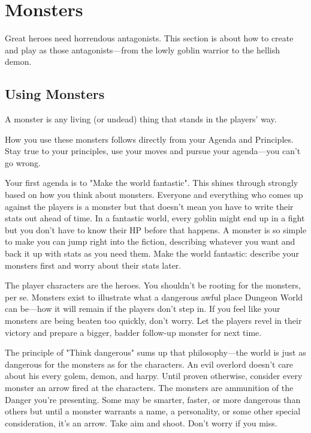 \chapter{Monsters}
  
            

Great heroes need horrendous antagonists. This section is about how to create and play as those antagonists—from the lowly goblin warrior to the hellish demon.

       
\section{Using Monsters}   
       

A monster is any living (or undead) thing that stands in the players' way.

       

How you use these monsters follows directly from your Agenda and Principles. Stay true to your principles, use your moves and pursue your agenda—you can't go wrong. 

       

Your first agenda is to "Make the world fantastic". This shines through strongly based on how you think about monsters. Everyone and everything who comes up against the players is a monster but that doesn't mean you have to write their stats out ahead of time. In a fantastic world, every goblin might end up in a fight but you don't have to know their HP before that happens. A monster is so simple to make you can jump right into the fiction, describing whatever you want and back it up with stats as you need them. Make the world fantastic: describe your monsters first and worry about their stats later.

       

The player characters are the heroes. You shouldn't be rooting for the monsters, per se. Monsters exist to illustrate what a dangerous awful place Dungeon World can be—how it will remain if the players don't step in. If you feel like your monsters are being beaten too quickly, don't worry. Let the players revel in their victory and prepare a bigger, badder follow-up monster for next time.

       

The principle of "Think dangerous" sums up that philosophy—the world is just as dangerous for the monsters as for the characters. An evil overlord doesn't care about his every golem, demon, and harpy. Until proven otherwise, consider every monster an arrow fired at the characters. The monsters are ammunition of the Danger you're presenting. Some may be smarter, faster, or more dangerous than others but until a monster warrants a name, a personality, or some other special consideration, it's an arrow. Take aim and shoot. Don't worry if you miss.

